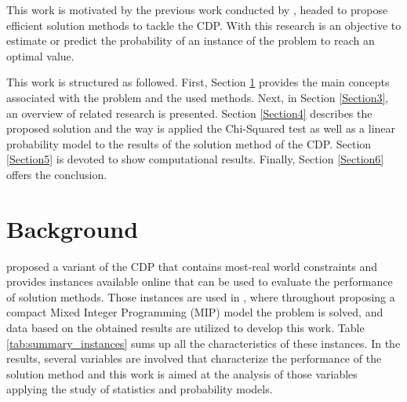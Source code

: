 \documentclass[5p,times]{elsarticle}
\begin{document}
	This work is motivated by the previous work conducted by \citet{hernandez2020study}, headed to propose efficient solution methods to tackle the CDP. With this research is an objective to estimate or predict the probability of an instance of the problem to reach an optimal value.
	
	This work is structured as followed. First, Section \ref{Section2} provides the main concepts associated with the problem and the used methods. Next, in Section \ref{Section3}, an overview of related research is presented. Section \ref{Section4} describes the proposed solution and the way is applied the Chi-Squared test as well as a linear probability model to the results of the solution method of the CDP. Section \ref{Section5} is devoted to show computational results. Finally, Section \ref{Section6} offers the conclusion.
	
\section{Background}\label{Section2}
	
	\citet{kinable2014concrete} proposed a variant of the CDP that contains most-real world constraints and provides instances available online that can be used to evaluate the performance of solution methods. Those instances are used in \citet{hernandez2020study}, where throughout proposing a compact Mixed Integer Programming (MIP) model the problem is solved, and data based on the obtained results are utilized to develop this work. Table \ref{tab:summary_instances} sums up all the characteristics of these instances. In the results, several variables are involved that characterize the performance of the solution method and this work is aimed at the analysis of those variables applying the study of statistics and probability models.
	 
\end{document}
